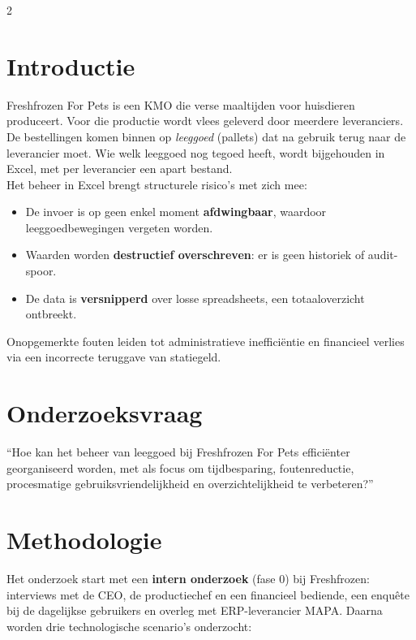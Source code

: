 \documentclass[a0,portrait]{hogent-poster}
\begin{document}
\begin{multicols}{2} %

\section{Introductie}

Freshfrozen For Pets is een KMO die verse maaltijden voor huisdieren produceert. Voor die productie wordt vlees geleverd door meerdere leveranciers. De bestellingen komen binnen op \emph{leeggoed} (pallets) dat na gebruik terug naar de leverancier moet. Wie welk leeggoed nog tegoed heeft, wordt bijgehouden in Excel, met per leverancier een apart bestand.
\\
Het beheer in Excel brengt structurele risico's met zich mee:
\begin{itemize}
    \item De invoer is op geen enkel moment \textbf{afdwingbaar}, waardoor leeggoedbewegingen vergeten worden.
    \item Waarden worden \textbf{destructief overschreven}: er is geen historiek of audit-spoor.
    \item De data is \textbf{versnipperd} over losse spreadsheets, een totaaloverzicht ontbreekt.
\end{itemize}
Onopgemerkte fouten leiden tot administratieve inefficiëntie en financieel verlies via een incorrecte teruggave van statiegeld.

\section{Onderzoeksvraag}

``Hoe kan het beheer van leeggoed bij Freshfrozen For Pets efficiënter georganiseerd worden, met als focus om tijdbesparing, foutenreductie, procesmatige gebruiksvriendelijkheid en overzichtelijkheid te verbeteren?''

\section{Methodologie}

Het onderzoek start met een \textbf{intern onderzoek} (fase 0) bij Freshfrozen: interviews met de CEO, de productiechef en een financieel bediende, een enquête bij de dagelijkse gebruikers en overleg met ERP-leverancier MAPA. Daarna worden drie technologische scenario's onderzocht:


\end{multicols}
\end{document}
